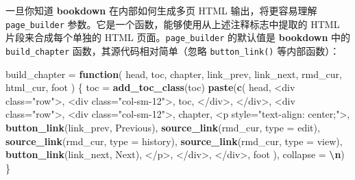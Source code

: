 \documentclass[
  12pt,
]{krantz}
\newenvironment{Shaded}{\begin{snugshade}}{\end{snugshade}}
\newcommand{\AttributeTok}[1]{\textcolor[rgb]{0.13,0.29,0.53}{#1}}
\newcommand{\ControlFlowTok}[1]{\textcolor[rgb]{0.13,0.29,0.53}{\textbf{#1}}}
\newcommand{\FunctionTok}[1]{\textcolor[rgb]{0.13,0.29,0.53}{\textbf{#1}}}
\newcommand{\NormalTok}[1]{#1}
\newcommand{\OtherTok}[1]{\textcolor[rgb]{0.56,0.35,0.01}{#1}}
\newcommand{\SpecialCharTok}[1]{\textcolor[rgb]{0.81,0.36,0.00}{\textbf{#1}}}
\newcommand{\StringTok}[1]{\textcolor[rgb]{0.31,0.60,0.02}{#1}}
\theoremstyle{definition}
\theoremstyle{definition}
\theoremstyle{definition}
\theoremstyle{definition}
\theoremstyle{remark}
\begin{document}
一旦你知道 \textbf{bookdown} 在内部如何生成多页 HTML 输出，将更容易理解 \texttt{page\_builder} 参数。它是一个函数，能够使用从上述注释标志中提取的 HTML 片段来合成每个单独的 HTML 页面。\texttt{page\_builder} 的默认值是 \textbf{bookdown} 中的 \texttt{build\_chapter} 函数，其源代码相对简单（忽略 \texttt{button\_link()} 等内部函数）：

\begin{Shaded}
\begin{Highlighting}[]
\NormalTok{build\_chapter }\OtherTok{=} \ControlFlowTok{function}\NormalTok{(}
\NormalTok{  head, toc, chapter, link\_prev, link\_next, rmd\_cur, html\_cur, foot}
\NormalTok{) \{}
\NormalTok{  toc }\OtherTok{=} \FunctionTok{add\_toc\_class}\NormalTok{(toc)}
  \FunctionTok{paste}\NormalTok{(}\FunctionTok{c}\NormalTok{(}
\NormalTok{    head,}
    \StringTok{\textquotesingle{}\textless{}div class="row"\textgreater{}\textquotesingle{}}\NormalTok{,}
    \StringTok{\textquotesingle{}\textless{}div class="col{-}sm{-}12"\textgreater{}\textquotesingle{}}\NormalTok{,}
\NormalTok{    toc,}
    \StringTok{\textquotesingle{}\textless{}/div\textgreater{}\textquotesingle{}}\NormalTok{,}
    \StringTok{\textquotesingle{}\textless{}/div\textgreater{}\textquotesingle{}}\NormalTok{,}
    \StringTok{\textquotesingle{}\textless{}div class="row"\textgreater{}\textquotesingle{}}\NormalTok{,}
    \StringTok{\textquotesingle{}\textless{}div class="col{-}sm{-}12"\textgreater{}\textquotesingle{}}\NormalTok{,}
\NormalTok{    chapter,}
    \StringTok{\textquotesingle{}\textless{}p style="text{-}align: center;"\textgreater{}\textquotesingle{}}\NormalTok{,}
    \FunctionTok{button\_link}\NormalTok{(link\_prev, }\StringTok{\textquotesingle{}Previous\textquotesingle{}}\NormalTok{),}
    \FunctionTok{source\_link}\NormalTok{(rmd\_cur, }\AttributeTok{type =} \StringTok{\textquotesingle{}edit\textquotesingle{}}\NormalTok{),}
    \FunctionTok{source\_link}\NormalTok{(rmd\_cur, }\AttributeTok{type =} \StringTok{\textquotesingle{}history\textquotesingle{}}\NormalTok{),}
    \FunctionTok{source\_link}\NormalTok{(rmd\_cur, }\AttributeTok{type =} \StringTok{\textquotesingle{}view\textquotesingle{}}\NormalTok{),}
    \FunctionTok{button\_link}\NormalTok{(link\_next, }\StringTok{\textquotesingle{}Next\textquotesingle{}}\NormalTok{),}
    \StringTok{\textquotesingle{}\textless{}/p\textgreater{}\textquotesingle{}}\NormalTok{,}
    \StringTok{\textquotesingle{}\textless{}/div\textgreater{}\textquotesingle{}}\NormalTok{,}
    \StringTok{\textquotesingle{}\textless{}/div\textgreater{}\textquotesingle{}}\NormalTok{,}
\NormalTok{    foot}
\NormalTok{  ), }\AttributeTok{collapse =} \StringTok{\textquotesingle{}}\SpecialCharTok{\textbackslash{}n}\StringTok{\textquotesingle{}}\NormalTok{)}
\NormalTok{\}}
\end{Highlighting}
\end{Shaded}
\end{document}
